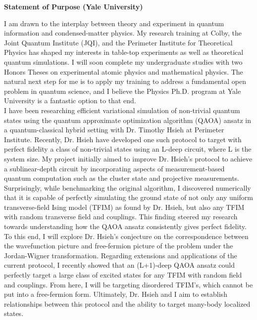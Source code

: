 \documentclass[12pt]{article}
\begin{document}
\begin{center}
	\textbf{Statement of Purpose (Yale University)}
\end{center}
I am drawn to the interplay between theory and experiment in quantum information and condensed-matter physics. My research training at Colby, the Joint Quantum Institute (JQI), and the Perimeter Institute for Theoretical Physics has shaped my interests in table-top experiments as well as theoretical quantum simulations. I will soon complete my undergraduate studies with two Honors Theses on experimental atomic physics and mathematical physics. The natural next step for me is to apply my training to address a fundamental open problem in quantum science, and I believe the Physics Ph.D. program at Yale University is a fantastic option to that end.   \\ 

I have been researching efficient variational simulation of non-trivial quantum states using the quantum approximate optimization algorithm (QAOA) ansatz in a quantum-classical hybrid setting with Dr. Timothy Hsieh at Perimeter Institute. Recently, Dr. Hsieh have developed one such protocol to target with perfect fidelity a class of non-trivial states using an L-deep circuit, where L is the system size. My project initially aimed to improve Dr. Hsieh's protocol to achieve a sublinear-depth circuit by incorporating aspects of measurement-based quantum computation such as the cluster state and projective measurements. Surprisingly, while benchmarking the original algorithm, I discovered numerically that it is capable of perfectly simulating the ground state of not only any uniform transverse-field Ising model (TFIM) as found by Dr. Hsieh, but also any TFIM with random transverse field and couplings. This finding steered my research towards understanding how the QAOA ansatz consistently gives perfect fidelity. To this end, I will explore Dr. Hsieh's conjecture on the correspondence between the wavefunction picture and free-fermion picture of the problem under the Jordan-Wigner transformation. Regarding extensions and applications of the current protocol, I recently showed that an (L+1)-deep QAOA ansatz could perfectly target a large class of excited states for any TFIM with random field and couplings. From here, I will be targeting disordered TFIM's, which cannot be put into a free-fermion form. Ultimately, Dr. Hsieh and I aim to establish relationships between this protocol and the ability to target many-body localized states.\\
\end{document}
